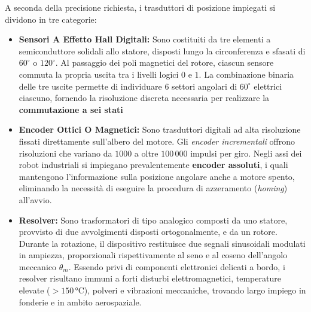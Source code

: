 ﻿\documentclass[11pt, a4paper]{article}
\begin{document}
A seconda della precisione richiesta, i trasduttori di posizione impiegati si dividono in tre categorie:
\begin{itemize}
    \item \textbf{Sensori A Effetto Hall Digitali:} Sono costituiti da tre elementi a semiconduttore solidali allo statore, disposti lungo la circonferenza e sfasati di  $60^\circ$ o $120^\circ$. Al passaggio dei poli magnetici del rotore, ciascun sensore commuta la propria uscita tra i livelli logici $0$ e $1$. La combinazione binaria delle tre uscite permette di individuare $6$ settori angolari di $60^\circ$ elettrici ciascuno, fornendo la risoluzione discreta necessaria per realizzare la \textbf{commutazione a sei stati}

    \item \textbf{Encoder Ottici O Magnetici:} Sono trasduttori digitali ad alta risoluzione fissati direttamente sull'albero del motore. Gli \textit{encoder incrementali} offrono risoluzioni che variano da $1000$ a oltre $100\,000$ impulsi per giro. Negli assi dei robot industriali si impiegano prevalentemente \textbf{encoder assoluti}, i quali mantengono l'informazione sulla posizione angolare anche a motore spento, eliminando la necessità di eseguire la procedura di azzeramento (\textit{homing}) all'avvio.

    \item \textbf{Resolver:} Sono trasformatori di tipo analogico composti da uno statore, provvisto di due avvolgimenti disposti ortogonalmente, e da un rotore. Durante la rotazione, il dispositivo restituisce due segnali sinusoidali modulati in ampiezza, proporzionali rispettivamente al seno e al coseno dell'angolo meccanico $\theta_m$. Essendo privi di componenti elettronici delicati a bordo, i resolver risultano immuni a forti disturbi elettromagnetici, temperature elevate ($> 150\,\si{\celsius}$), polveri e vibrazioni meccaniche, trovando largo impiego in fonderie e in ambito aerospaziale.
\end{itemize}
\end{document}
